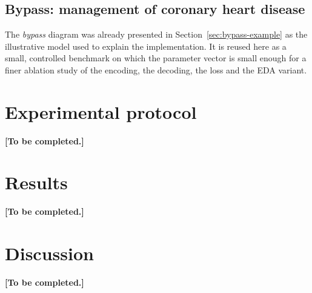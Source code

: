 \subsection{Bypass: management of coronary heart disease}
\label{sec:bypass-bench}

The \emph{bypass} diagram was already presented in
Section~\ref{sec:bypass-example} as the illustrative model used to
explain the implementation. It is reused here as a small, controlled
benchmark on which the parameter vector is small enough for a finer
ablation study of the encoding, the decoding, the loss and the EDA
variant.

\section{Experimental protocol}
\label{sec:protocol}


\bigskip
\textbf{[To be completed.]}

\section{Results}
\label{sec:results}


\bigskip
\textbf{[To be completed.]}

\section{Discussion}
\label{sec:discussion}


\bigskip
\textbf{[To be completed.]}
